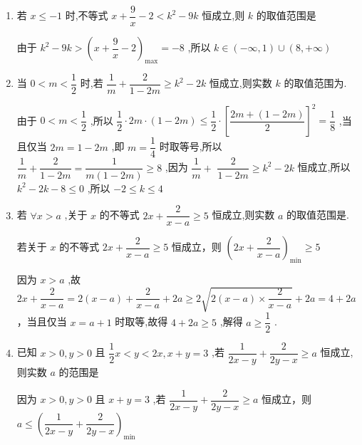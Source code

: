 \begin{enumerate}
\begin{jieda}
         ${x}_{1} + {x}_{2} + \dfrac{3a}{{x}_{1}{x}_{2}} = {6a} + \dfrac{1}{a} \geq  2\sqrt{{6a} \cdot  \dfrac{1}{a}} = 2\sqrt{6}\text{,当且仅当}{6a} =  $
        $\dfrac{1}{a}$ ,即 $a = \dfrac{\sqrt{6}}{6}$ 时取等号，所以 ${x}_{1} + {x}_{2} + \dfrac{3a}{{x}_{1}{x}_{2}}$ 的最小值为 $2\sqrt{6}$
    \end{jieda}
    \item 若 $x \leq   - 1$ 时,不等式 $x + \dfrac{9}{x} - 2 < {k}^{2} - {9k}$ 恒成立,则 $k$ 的取值范围是
    \begin{jieda}
         由于 ${k}^{2} - {9k} > {\left( x + \dfrac{9}{x} - 2\right) }_{\max } =  - 8$ ,所以 $k \in  \left( {-\infty ,1}\right)  \cup  \left( {8, + \infty }\right)$
    \end{jieda}
    \item 当 $0 < m < \dfrac{1}{2}$ 时,若 $\dfrac{1}{m} + \dfrac{2}{1 - {2m}} \geq  {k}^{2} - {2k}$ 恒成立,则实数 $k$ 的取值范围为\blkda[4]{$[-2,4]$}.
    \begin{jieda}
        由于 $0 < m < \dfrac{1}{2}$ ,所以 $\dfrac{1}{2} \cdot  {2m} \cdot  \left( {1 - {2m}}\right)  \leq  \dfrac{1}{2} \cdot  {\left\lbrack  \dfrac{{2m} + \left( {1 - {2m}}\right) }{2}\right\rbrack  }^{2} = \dfrac{1}{8}$ ,当且仅当 ${2m} = 1 - {2m}$ ,即 $m = \dfrac{1}{4}$ 时取等号,所以 $\dfrac{1}{m} + \dfrac{2}{1 - {2m}} = \dfrac{1}{m\left( {1 - {2m}}\right) } \geq  8$ ,因为 $\dfrac{1}{m} +$  $\dfrac{2}{1 - {2m}} \geq  {k}^{2} - {2k}$ 恒成立,所以 ${k}^{2} - {2k} - 8 \leq  0$ ,所以 $- 2 \leq  k \leq  4$
    \end{jieda}
    \item 若 $\forall x > a$ ,关于 $x$ 的不等式 ${2x} + \dfrac{2}{x - a} \geq  5$ 恒成立,则实数 $a$ 的取值范围是.
    \begin{jieda}
        若关于 $x$ 的不等式 ${2x} + \dfrac{2}{x - a} \geq  5$ 恒成立，则 ${\left( 2x + \dfrac{2}{x - a}\right) }_{\min } \geq  5$
        
        因为 $x > a$ ,故 ${2x} + \dfrac{2}{x - a} = 2\left( {x - a}\right)  + \dfrac{2}{x - a} + {2a} \geq  2\sqrt{2\left( {x - a}\right)  \times  \dfrac{2}{x - a}} + {2a} = 4 + {2a}$ ，当且仅当 $x = a + 1$ 时取等,故得 $4 + {2a} \geq  5$ ,解得 $a \geq  \dfrac{1}{2}$ .
    \end{jieda}
    \item 已知 $x > 0,y > 0$ 且 $\dfrac{1}{2}x < y < {2x},x + y = 3$ ,若 $\dfrac{1}{{2x} - y} + \dfrac{2}{{2y} - x} \geq  a$ 恒成立,则实数 $a$ 的范围是 
    \begin{jieda}
        因为 $x > 0,y > 0$ 且 $x + y = 3$ ,若 $\dfrac{1}{{2x} - y} + \dfrac{2}{{2y} - x} \geq  a$ 恒成立，则 $a \leq  {\left( \dfrac{1}{{2x} - y} + \dfrac{2}{{2y} - x}\right) }_{\min }$
        

\end{jieda}
\end{enumerate}
